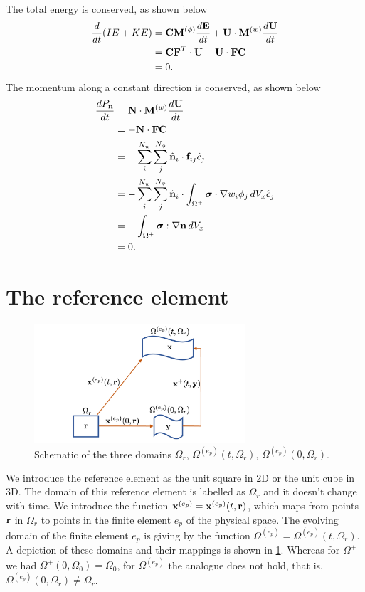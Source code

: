 \documentclass[11pt]{report}
\begin{document}
The total energy is conserved, as shown below
\begin{align}
    \frac{d}{dt} (IE + KE) &= \mathbf{C} \mathbf{M}^{(\phi)} \frac{d\mathbf{E}}{dt} + \mathbf{U} \cdot \mathbf{M}^{(w)} \frac{d\mathbf{U}}{dt} \nonumber \\
    &= \mathbf{C} \mathbf{F}^T \cdot \mathbf{U} - \mathbf{U} \cdot \mathbf{F} \mathbf{C} \nonumber \\
    &= 0.
\end{align}
The momentum along a constant direction is conserved, as shown below
\begin{align}
    \frac{d P_{\mathbf{n}}}{dt} &= \mathbf{N} \cdot \mathbf{M}^{(w)} \frac{d \mathbf{U}}{dt} \nonumber \\
    &= -\mathbf{N} \cdot \mathbf{F} \mathbf{C} \nonumber \\
    &= -\sum_i^{N_w} \sum_j^{N_\phi} \hat{\mathbf{n}}_i \cdot \mathbf{f}_{ij} \hat{c}_j \nonumber \\
    &= -\sum_i^{N_w} \sum_j^{N_\phi} \hat{\mathbf{n}}_i \cdot \int_{\Omega^+} \bm \sigma \cdot \nabla w_i \phi_j \, dV_x \hat{c}_j \nonumber \\
    &= -\int_{\Omega^+} \bm \sigma : \nabla \mathbf{n} \, dV_x \nonumber \\
    &= 0.
\end{align}

\section{The reference element}
\begin{figure}[ht]
    \centering
    \includegraphics[width=0.7\textwidth]{../../images/three_spaces.pdf}
    \caption{Schematic of the three domains $\Omega_r$, $\Omega^{(e_p)}(t,\Omega_r)$, $\Omega^{(e_p)}(0,\Omega_r)$.}
    \label{fig:three_spaces}
 \end{figure}
We introduce the reference element as the unit square in 2D or the unit cube in 3D. The domain of this reference element is labelled as $\Omega_r$ and it doesn't change with time. We introduce the function $\mathbf{x}^{(e_p)} = \mathbf{x}^{(e_p)}(t,\mathbf{r})$, which maps from points $\mathbf{r}$ in $\Omega_r$ to points in the finite element $e_p$ of the physical space. The evolving domain of the finite element $e_p$ is giving  by the function $\Omega^{(e_p)} = \Omega^{(e_p)}(t,\Omega_r)$. A depiction of these domains and their mappings is shown in \cref{fig:three_spaces}. Whereas for $\Omega^+$ we had $\Omega^+(0,\Omega_0)=\Omega_0$, for $\Omega^{(e_p)}$ the analogue does not hold, that is, $\Omega^{(e_p)}(0,\Omega_r) \ne \Omega_r$.
\end{document}
